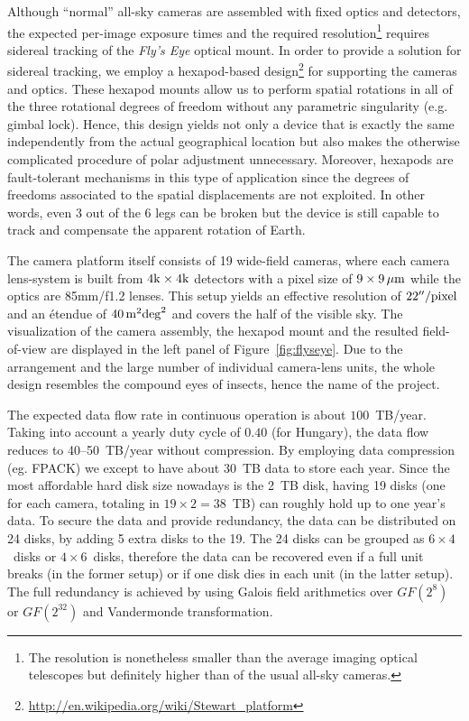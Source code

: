 Although ``normal'' all-sky cameras are assembled with fixed optics and 
detectors, the expected per-image exposure times and the required 
resolution\footnote{The resolution is nonetheless smaller than the 
average imaging optical 
telescopes but definitely higher than of the usual all-sky cameras.} requires 
sidereal tracking of the {\it Fly's Eye} optical mount. In order to provide 
a solution for sidereal tracking, we employ a hexapod-based 
design\footnote{\url{http://en.wikipedia.org/wiki/Stewart_platform}} 
for supporting the cameras and optics. These hexapod mounts allow us 
to perform spatial rotations in all of the three rotational degrees
of freedom without any parametric singularity (e.g. gimbal lock). Hence,
this design yields not only a device that is exactly the same 
independently from the actual geographical location but also makes
the otherwise complicated procedure of polar adjustment unnecessary. 
Moreover, hexapods are fault-tolerant mechanisms in this type of application
since the degrees of freedoms associated to the spatial displacements
are not exploited. In other words, even 3 out of the 6 legs can be broken
but the device is still capable to track and compensate the apparent 
rotation of Earth. 

The camera platform itself consists of 19 wide-field cameras, where each
camera lens-system is built from $4{\rm k}\times 4{\rm k}$ detectors
with a pixel size of $9\times9\,{\rm\mu m}$ while the optics are 85mm/f1.2
lenses. This setup yields an effective resolution of $22''/{\rm pixel}$
and an \'etendue of $40\,{\rm m}^2{\rm deg}^2$ and covers the half of the
visible sky. The visualization
of the camera assembly, the hexapod mount and the resulted field-of-view
are displayed in the left panel of Figure~\ref{fig:flyseye}. 
Due to the arrangement
and the large number of individual camera-lens units, the whole design
resembles the compound eyes of insects, hence the name of the project.

The expected data flow rate in continuous operation is about $100$~TB/year.
Taking into account a yearly duty cycle of $0.40$ (for Hungary), the data flow reduces to 40--50~TB/year without compression.
By employing data compression (eg. FPACK) we except to have about 30~TB data to store each year.
Since the most affordable hard disk size nowadays is the 2~TB disk, having 19 disks (one for each camera, totaling in $19\times2=38$~TB) can roughly hold up to one year's data. To secure the data and provide redundancy, the data can be distributed on 24 disks, by adding 5 extra disks to the 19. The 24 disks can be grouped as $6\times4$~disks or $4\times6$~disks, therefore the data can be recovered even if a full unit breaks (in the former setup) or if one disk dies in each unit (in the latter setup). The full redundancy is achieved by using Galois field arithmetics over $GF(2^8)$ or $GF(2^{32})$ and Vandermonde transformation.

